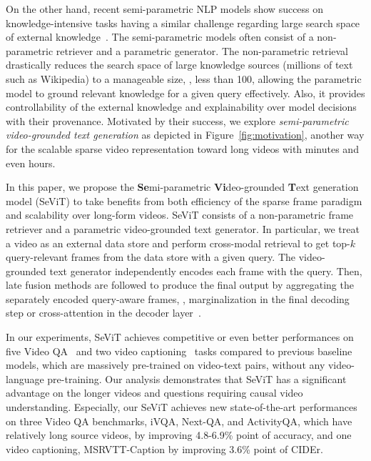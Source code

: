 \documentclass{article}
\newcommand{\frameworkname}{SeViT}
\begin{document}
On the other hand, recent semi-parametric NLP models show success on knowledge-intensive tasks having a similar challenge regarding large search space of external knowledge~\cite{lewis2020retrieval, izacard2021leveraging}. The semi-parametric models often consist of a non-parametric retriever and a parametric generator. The non-parametric retrieval drastically reduces the search space of large knowledge sources (millions of text such as Wikipedia) to a manageable size, \eg, less than 100, allowing the parametric model to ground relevant knowledge for a given query effectively. Also, it provides controllability of the external knowledge and explainability over model decisions with their provenance. Motivated by their success, we explore \textit{semi-parametric video-grounded text generation} as depicted in Figure~\ref{fig:motivation}, another way for the scalable sparse video representation toward long videos with minutes and even hours.

In this paper, we propose the \textbf{Se}mi-parametric \textbf{Vi}deo-grounded \textbf{T}ext generation model (\frameworkname{}) to take benefits from both efficiency of the sparse frame paradigm and scalability over long-form videos. \frameworkname{} consists of a non-parametric frame retriever and a parametric video-grounded text generator. In particular, we treat a video as an external data store and perform cross-modal retrieval to get top-$k$ query-relevant frames from the data store with a given query. The video-grounded text generator independently encodes each frame with the query. Then, late fusion methods are followed to produce the final output by aggregating the separately encoded query-aware frames, \eg, marginalization in the final decoding step or cross-attention in the decoder layer~\cite{lewis2020retrieval, izacard2021leveraging}.

In our experiments, \frameworkname{} achieves competitive or even better performances on five Video QA~\cite{xu2017video, yu2019activitynet, yang2021just, xiao2021next} and two video captioning~\cite{chen2011collecting, xu2016msr} tasks compared to previous baseline models, which are massively pre-trained on video-text pairs, without any video-language pre-training. Our analysis demonstrates that \frameworkname{} has a significant advantage on the longer videos and questions requiring causal video understanding. Especially, our \frameworkname{} achieves new state-of-the-art performances on three Video QA benchmarks, iVQA, Next-QA, and ActivityQA, which have relatively long source videos, by improving 4.8-6.9\% point of accuracy, and one video captioning, MSRVTT-Caption by improving 3.6\% point of CIDEr.
\end{document}
